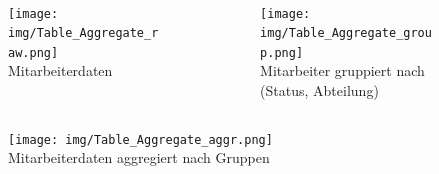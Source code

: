 \begin{frame}
\frametitle{\insertsection}
\framesubtitle{\insertsubsection}
\onslide 
{}\\[-12pt]
\begin{columns}
	\begin{column}{.3\textwidth}		
		\begin{figure} 
			\texttt{[image: img/Table\_Aggregate\_raw.png]}\\[-9pt]
			{\tiny Mitarbeiterdaten}
		\end{figure}
	\end{column}
	\pause
	\begin{column}{.3\textwidth}		
		\begin{figure} 
			\texttt{[image: img/Table\_Aggregate\_group.png]}\\[-9pt]
			{\tiny Mitarbeiter gruppiert nach (Status, Abteilung)}
		\end{figure}
	\end{column}
\end{columns}
\pause 
\begin{figure} 
	\texttt{[image: img/Table\_Aggregate\_aggr.png]}\\[-8pt]
	{\tiny Mitarbeiterdaten aggregiert nach Gruppen}
\end{figure}
\end{frame}

